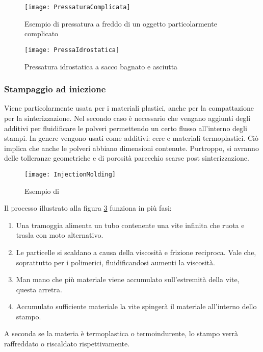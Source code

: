 \begin{figure}
\centering
\texttt{[image: PressaturaComplicata]}
\caption{Esempio di pressatura a freddo di un oggetto particolarmente complicato}
\label{fig:PressaturaComplicata}
\end{figure}

\begin{figure}
\centering
\texttt{[image: PressaIdrostatica]}
\caption{Pressatura idrostatica a sacco bagnato e asciutta}
\label{fig:PressaIdrostatica}
\end{figure}

\subsubsection{Stampaggio ad iniezione}
Viene particolarmente usata per i materiali plastici, anche per la compattazione per la sinterizzazione.
Nel secondo caso è necessario che vengano aggiunti degli additivi per fluidificare le polveri permettendo un certo flusso all'interno degli stampi.
In genere vengono usati come additivi: cere e materiali termoplastici.
Ciò implica che anche le polveri abbiano dimensioni contenute.
Purtroppo, si avranno delle tolleranze geometriche e di porosità parecchio scarse post sinterizzazione.

\begin{figure}
\centering
\texttt{[image: InjectionMolding]}
\caption{Esempio di }
\label{fig:InjectionMolding}
\end{figure}

Il processo illustrato alla figura \ref{fig:InjectionMolding} funziona in più fasi:
\begin{enumerate}
\item Una tramoggia alimenta un tubo contenente una vite infinita che ruota e trasla con moto alternativo.
\item Le particelle si scaldano a causa della viscosità e frizione reciproca.
Vale che, soprattutto per i polimerici, fluidificandosi aumenti la viscosità.
\item Man mano che più materiale viene accumulato sull'estremità della vite, questa arretra.
\item Accumulato sufficiente materiale la vite spingerà il materiale all'interno dello stampo.
\end{enumerate}

A seconda se la materia è termoplastica o termoindurente, lo stampo verrà raffreddato o riscaldato rispettivamente.

